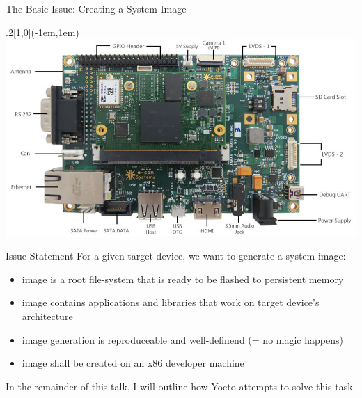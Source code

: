 \documentclass[ucs,9pt]{beamer}
\begin{document}
\begin{frame}
    {The Basic Issue: Creating a System Image}

    \begin{textblock*}{.2\paperwidth}[1,0](\paperwidth-1em,1em)%
        \includegraphics[width=\linewidth]{images/example-board}
    \end{textblock*}%


    \begin{block}{Issue Statement}
    For a given target device, we want to generate a system image:
    \begin{itemize}
        \item image is a root file-system that is {\color{KDEblue}ready to be flashed} to persistent memory
        \item image contains applications and libraries that {\color{KDEblue}work on target device's architecture}
        \item image generation is {\color{KDEblue}reproduceable and well-definend} (= no magic happens)
        \item image shall be {\color{KDEblue}created on an x86 developer machine}
    \end{itemize}
    \end{block}
    \bigskip\par
    In the remainder of this talk, I will outline how Yocto attempts to solve this task.
\end{frame}
\end{document}

